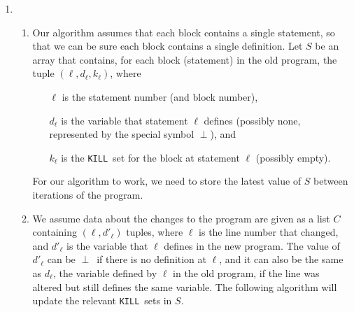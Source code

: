 \documentclass{article}
\newcommand\bottom{\ensuremath{\perp}}
\newcommand\Kill{\texttt{KILL}}
\begin{document}
\begin{enumerate}
\begin{enumerate}
    \end{enumerate}

  \item
    \begin{enumerate}
      \item Our algorithm assumes that each block contains a single
        statement, so that we can be sure each block contains a single
        definition. Let $S$ be an array that contains, for each block
        (statement) in the old program, the tuple $(\ell, d_\ell,
        k_\ell)$, where
        \begin{itemize}
          \item[$\ell$] is the statement number (and block number),
          \item[$d_\ell$]is the variable that statement $\ell$ defines
            (possibly none, represented by the special symbol
            \bottom), and
          \item[$k_\ell$] is the \Kill\ set for the block at statement
            $\ell$ (possibly empty).
        \end{itemize}
        For our algorithm to work, we need to store the latest value
        of $S$ between iterations of the program.
      \item We assume data about the changes to the program are given
        as a list $C$ containing $(\ell, d'_\ell)$ tuples, where
        $\ell$ is the line number that changed, and $d'_\ell$ is the
        variable that $\ell$ defines in the new program. The value of
        $d'_\ell$ can be \bottom\ if there is no definition at $\ell$,
        and it can also be the same as $d_\ell$, the variable defined
        by $\ell$ in the old program, if the line was altered but
        still defines the same variable. The following algorithm will
        update the relevant \Kill\ sets in $S$.


\end{enumerate}
\end{enumerate}
\end{document}
